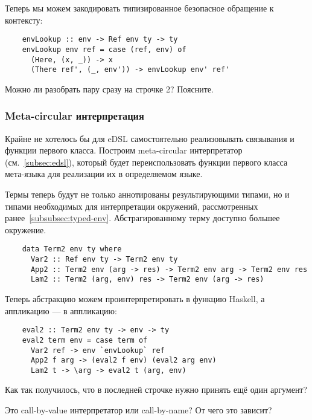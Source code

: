 Теперь мы можем закодировать типизированное безопасное обращение к контексту:
\begin{verbatim}
    envLookup :: env -> Ref env ty -> ty
    envLookup env ref = case (ref, env) of
      (Here, (x, _)) -> x
      (There ref', (_, env')) -> envLookup env' ref'
\end{verbatim}

\begin{task}
    Можно ли разобрать пару сразу на строчке 2?
    Поясните.
\end{task}

\subsubsection{Meta-circular интерпретация}

Крайне не хотелось бы для eDSL самостоятельно реализовывать связывания и функции первого класса.
Построим meta-circular интерпретатор (см.~\ref{subsec:edsl}), который будет переиспользовать функции первого класса мета-языка для реализации их в определяемом языке.

Термы теперь будут не только аннотированы результирующими типами, но и типами необходимых для интерпретации окружений, рассмотренных ранее~\ref{subsubsec:typed-env}.
Абстрагированному терму доступно большее окружение.

\begin{verbatim}
    data Term2 env ty where
      Var2 :: Ref env ty -> Term2 env ty
      App2 :: Term2 env (arg -> res) -> Term2 env arg -> Term2 env res
      Lam2 :: Term2 (arg, env) res -> Term2 env (arg -> res)
\end{verbatim}

Теперь абстракцию можем проинтерпретировать в функцию Haskell, а аппликацию --- в аппликацию:
\begin{verbatim}
    eval2 :: Term2 env ty -> env -> ty
    eval2 term env = case term of
      Var2 ref -> env `envLookup` ref
      App2 f arg -> (eval2 f env) (eval2 arg env)
      Lam2 t -> \arg -> eval2 t (arg, env)
\end{verbatim}

\begin{task}
    Как так получилось, что в последней строчке нужно принять ещё один аргумент?
\end{task}

\begin{task}
    Это call-by-value интерпретатор или call-by-name?
    От чего это зависит?
\end{task}

